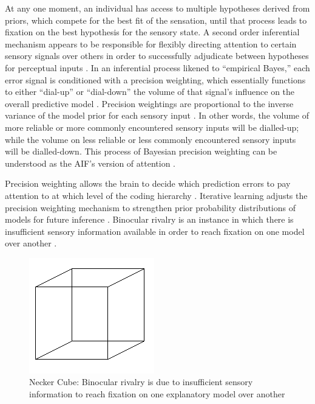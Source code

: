 \begin{CJK}{UTF8}{gbsn}
At any one moment, an individual has access to multiple hypotheses derived from priors, which compete for the best fit of the sensation, until that process leads to fixation on the best hypothesis for the sensory state.  A second order inferential mechanism appears to be responsible for flexibly directing attention to certain sensory signals over others in order to successfully adjudicate between hypotheses for perceptual inputs \citep{Clark2013}.  In an inferential process likened to ``empirical Bayes,'' each error signal is conditioned with a precision weighting, which essentially functions to either ``dial-up'' or ``dial-down'' the volume of that signal's influence on the overall predictive model \citep{Clark2015}.  Precision weightings are proportional to the inverse variance of the model prior for each sensory input \citep{Ernst2004,FitzGerald2014}.  In other words, the volume of more reliable or more commonly encountered sensory inputs will be dialled-up; while the volume on less reliable or less commonly encountered sensory inputs will be dialled-down. This process of Bayesian precision weighting can be understood as the AIF's version of attention \citep{Ramstead2016}.

Precision weighting allows the brain to decide which prediction errors to pay attention to at which level of the coding hierarchy \citep[be it high and conceptual or deep and sensory][]{Friston2015}.  Iterative learning adjusts the precision weighting mechanism to strengthen prior probability distributions of models for future inference \citep{Robbins1964}.  Binocular rivalry is an instance in which there is insufficient sensory information available in order to reach fixation on one model over another \citep[for example, looking at a necker cube, see Figure ~\ref{fig:neckerCube}][]{Frith2007}.

\begin{figure}[htbp]
  \begin{center}
    \includegraphics[scale=.7]{images/Necker_cube.png}
      \caption{Necker Cube: Binocular rivalry is due to insufficient sensory information to reach fixation on one explanatory model over another}
        \label{fig:neckerCube}
   \end{center}
\end{figure}



\end{CJK}
